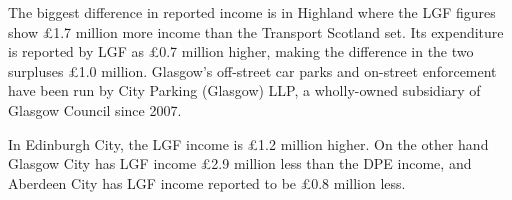 \documentclass[
  12pt,
]{article}
\begin{document}
The biggest difference in reported income is in Highland where the LGF figures show £1.7 million more income than the Transport Scotland set. Its expenditure is reported by LGF as £0.7 million higher, making the difference in the two surpluses £1.0 million. Glasgow's off-street car parks and on-street enforcement have been run by City Parking (Glasgow) LLP, a wholly-owned subsidiary of Glasgow Council since 2007.

In Edinburgh City, the LGF income is £1.2 million higher. On the other hand Glasgow City has LGF income £2.9 million less than the DPE income, and Aberdeen City has LGF income reported to be £0.8 million less.

\newpage
\begin{landscape}
\begin{table}[H]


\end{table}
\end{landscape}
\end{document}
